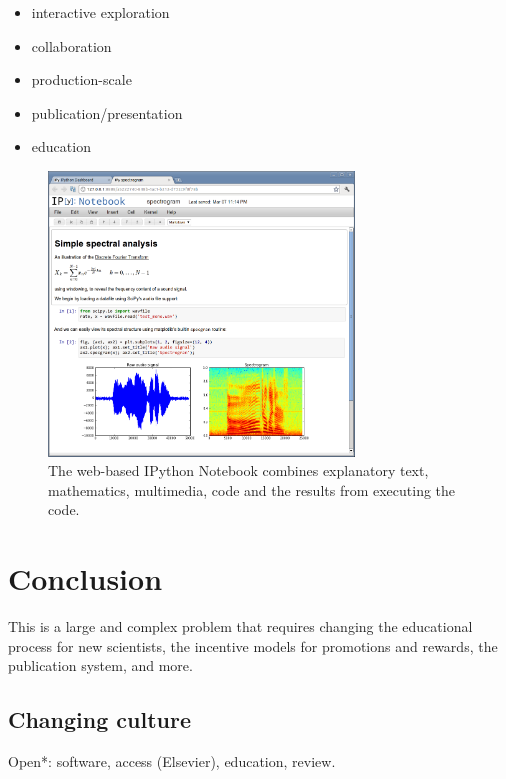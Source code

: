 \documentclass[ChapterTOCs,krantz2]{krantz} %
\begin{document}
\begin{itemize}

\item interactive exploration
\item collaboration
\item production-scale
\item publication/presentation \cite{brown2012single}
\item education
 
\end{itemize}
\begin{figure}
\begin{centering}
\includegraphics[width=3.2in]{fig/ipython-notebook-specgram.png}
\par\end{centering}

\caption{\label{fig:IPython-notebook}The web-based IPython Notebook combines
explanatory text, mathematics, multimedia, code and the results from
executing the code.}
\end{figure}



\section{Conclusion}\label{conclusion}

This is a large and complex problem that requires changing the educational
process for new scientists, the incentive models for promotions and
rewards, the publication system, and more.


\subsection{Changing culture}

Open{*}: software, access (Elsevier), education, review.
\end{document}
